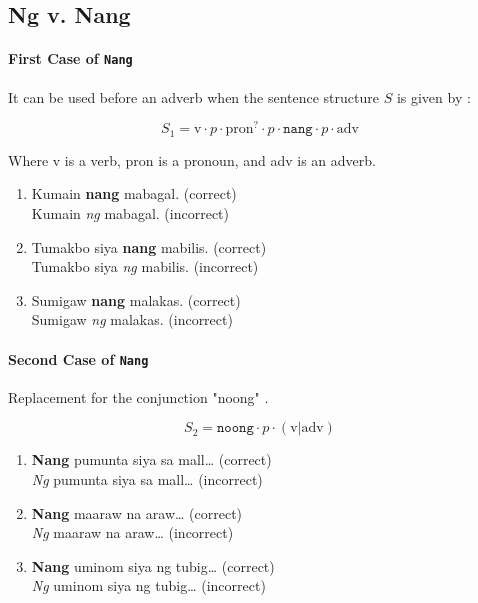 \subsection{Ng v. Nang}

\paragraph{First Case of \texttt{Nang}} It can be used before an adverb when the sentence structure $S$ is given by \cite{KWF}:

\[
      S_1 = \text{v} \cdot p \cdot \text{pron}^? \cdot p \cdot \texttt{nang} \cdot p \cdot \text{adv}
\]

Where v is a verb, pron is a pronoun, and adv is an adverb.

\begin{example}
\end{example}

\begin{enumerate}
      \item Kumain \textbf{nang} mabagal. (correct)
            \\ Kumain \textit{ng} mabagal. (incorrect)
      \item Tumakbo siya \textbf{nang} mabilis. (correct)
            \\ Tumakbo siya \textit{ng} mabilis. (incorrect)
      \item Sumigaw \textbf{nang} malakas. (correct)
            \\ Sumigaw \textit{ng} malakas. (incorrect)
\end{enumerate}

\paragraph{Second Case of \texttt{Nang}} Replacement for the conjunction "noong" \cite{KWF}.

\[
      S_2 = \texttt{noong} \cdot p \cdot (\text{v} \vert \text{adv})
\]

\begin{example}

\end{example}

\begin{enumerate}
      \item \textbf{Nang} pumunta siya sa mall… (correct)
        \\ \textit{Ng} pumunta siya sa mall… (incorrect)
      \item \textbf{Nang} maaraw na araw… (correct)
            \\ \textit{Ng} maaraw na araw… (incorrect)
            \item \textbf{Nang} uminom siya ng tubig… (correct)
            \\ \textit{Ng} uminom siya ng tubig… (incorrect)
\end{enumerate}

